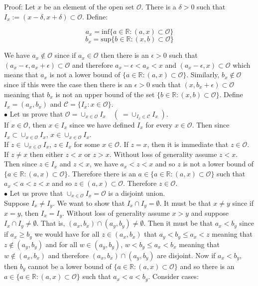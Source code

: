 \documentclass[a4paper]{article}
\begin{document}
Proof: Let $x$ be an element of the open set $\mathcal{O}$. There is a $\delta >0$ such that $I_x := (x-\delta, x+\delta) \subset \mathcal{O}$. Define:

$$a_x = \text{inf}\{a \in \mathbb{R} : (a,x)\subset \mathcal{O}\}$$
$$b_x = \text{sup}\{b \in \mathbb{R} : (x,b) \subset \mathcal{O}\}$$

We have $a_x \not\in \mathcal{O}$ since if $a_x \in \mathcal{O}$ then there is an $\epsilon > 0 $ such that $(a_x-\epsilon, a_x+ \epsilon) \subset \mathcal{O}$ and therefore $a_x-\epsilon < a_x < x$ and $(a_x-\epsilon, x) \subset \mathcal{O}$ which means that $a_x$ is not a lower bound of $\{a \in \mathbb{R} : (a,x)\subset \mathcal{O}\}$. Similarly, $b_x \not \in \mathcal{O}$ since if this were the case then there is an $\epsilon>0$ such that $(x, b_x + \epsilon) \subset \mathcal{O}$ meaning that $b_x$ is not an upper bound of the set $\{b \in \mathbb{R} : (x,b) \subset \mathcal{O}\}$. Define $I_x = (a_x,b_x)$ and $\mathcal{C} = \{I_x : x \in \mathcal{O}\}$.\\

$\bullet$ Let us prove that $\mathcal{O} = \cup_{x \in \mathcal{O}} I_x \quad ( \;= \cup_{I_x \in \mathcal{C}} I_x \;)$.\\

If $x \in \mathcal{O}$, then $x \in I_x$ since we have defined $I_x$ for every $x \in \mathcal{O}$. Then since $I_x \subset \cup_{x \in \mathcal{O}} I_x$, $x \in \cup_{x \in \mathcal{O}} I_x$. \\

If $z \in \cup_{x \in \mathcal{O}} I_x$, $z \in I_x$ for some $x \in \mathcal{O}$. If $z = x$, then it is immediate that $z \in \mathcal{O}$. If $z \neq x$ then either $z<x$ or $z>x$. Without loss of generality assume $z<x$. Then since $z \in I_x$ and $z<x$, we have $a_x < z < x$ and so $z$ is not a lower bound of $\{a \in \mathbb{R} : (a,x)\subset \mathcal{O}\}$. Therefore there is an $a \in \{a \in \mathbb{R} : (a,x)\subset \mathcal{O}\}$ such that $a_x < a < z < x$ and so $z \in (a,x) \subset \mathcal{O}$. Therefore $z \in \mathcal{O}$.\\

$\bullet$ Let us prove that $\cup_{x \in \mathcal{O}} I_x = \mathcal{O}$ is a disjoint union.\\

Suppose $I_x \neq I_y$. We want to show that $I_x \cap I_y = \emptyset$. It must be that $x \neq y$ since if $x=y$, then $I_x = I_y$. Without loss of generality assume $x>y$ and suppose $I_x \cap I_y \neq \emptyset$. That is, $(a_x,b_x) \cap (a_y, b_y) \neq \emptyset$. Then it must be that $a_x < b_y$ since if $a_x \geq b_y$ we would have for all $z \in (a_x,b_x)$ that $a_y < b_y \leq a_x < z$ meaning that $z \not\in (a_y,b_y)$ and for all $w \in (a_y,b_y)$, $w<b_y\leq a_x < b_x$ meaning that $w \not\in (a_x,b_x)$ and therefore $(a_x,b_x)\cap (a_y,b_y)$ are disjoint. Now if $a_x < b_y$, then $b_y$ cannot be a lower bound of $\{a \in \mathbb{R} : (a,x)\subset \mathcal{O}\}$ and so there is an $a \in \{a \in \mathbb{R} : (a,x)\subset \mathcal{O}\}$ such that $a_x<a<b_y$. Consider cases:\\
\end{document}

